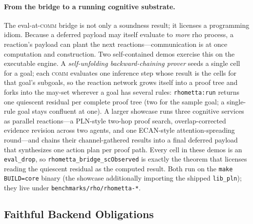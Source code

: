 \documentclass[11pt]{article}
\newcommand{\code}[1]{\texttt{#1}}
\begin{document}
\paragraph{From the bridge to a running cognitive substrate.}
The eval-at-\textsc{comm} bridge is not only a soundness result; it licenses a
programming idiom.  Because a deferred payload may itself evaluate to \emph{more}
rho process, a reaction's payload can plant the next reactions---communication is
at once computation and construction.  Two self-contained demos exercise this on
the executable engine.  A \emph{self-unfolding backward-chaining prover} seeds a
single cell for a goal; each \textsc{comm} evaluates one inference step whose
result is the cells for that goal's subgoals, so the reaction network grows
itself into a proof tree and forks into the may-set wherever a goal has several
rules: \code{rhometta:run} returns one quiescent residual per complete proof
tree (two for the sample goal; a single-rule goal stays confluent at one).  A
larger showcase runs three cognitive services as parallel reactions---a
PLN-style two-hop proof search, overlap-corrected evidence revision across two
agents, and one ECAN-style attention-spreading round---and chains their
channel-gathered results into a final deferred payload that synthesizes one
action plan per proof path.  Every cell in these demos is an \code{eval\_drop},
so \code{rhometta\_bridge\_scObserved} is exactly the theorem that licenses
reading the quiescent residual as the computed result.  Both run on the
\code{make BUILD=core} binary (the showcase additionally importing the shipped
\code{lib\_pln}); they live under \code{benchmarks/rho/rhometta-*}.

\subsection{Faithful Backend Obligations}
\end{document}
